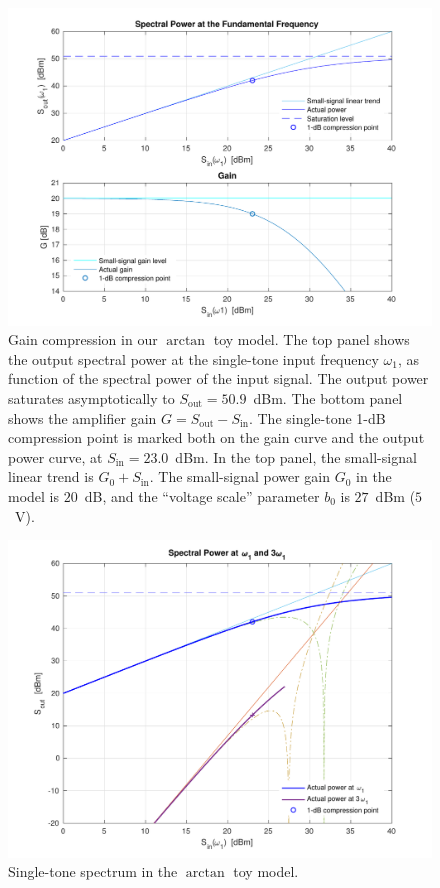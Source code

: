 \documentclass[11pt,oneside,a4paper]{scrartcl}
\newcommand { \mr }[1] {\ensuremath {\mathrm{#1}}}
\newcommand{\BL}[1]{\color{blue}#1 \color{black}}
\begin{document}
\begin{figure}
\centering
\includegraphics[width=1.0\linewidth]{fig/gaincompr_atan}
\caption [Gain compression with single-tone input.] 
{
\BL{Gain compression in our $\arctan$ toy model.} The top panel shows the output spectral power at the single-tone input frequency $\omega_1$, as function of the spectral power of the input signal. The output power saturates asymptotically to $S_\mr{ out}=50.9$~dBm. The bottom panel shows the amplifier gain $G = S_\mr{out}- S_\mr{in}$. The single-tone 1-dB compression point is marked both on the gain curve and the output power curve, at $S_\mr{in} = 23.0$~dBm. In the top panel, the small-signal linear trend is $G_0 + S_\mr{in}$. The small-signal power gain $G_0$ in the model is $20$~dB, and the ``voltage scale'' parameter $b_0$ is $27$~dBm ($5$~V). 
}
\label{Fig:gaincompr_atan}
\end{figure}


\begin{figure}
\centering
\includegraphics[width=1.0\linewidth]{fig/model_atan}
\caption [Single-tone spectrum in the $\arctan$ toy model.] 
{
\BL{Single-tone spectrum in the $\arctan$ toy model.}  
}
\label{Fig:model_atan}
\end{figure}
\end{document}
